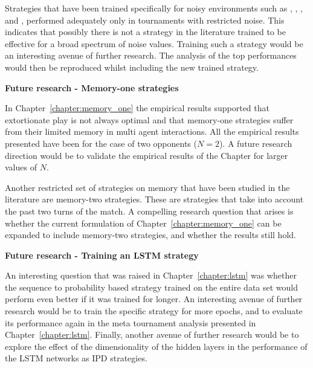 Strategies that have been trained specifically for noisy environments such
as \DBS, \EvolvedFSMSixTeenNoiseZeroFive, \EvolvedANNFiveNoiseZeroFive, \PSOGamblerTwoTwoTwoNoiseZeroFive
and \OmegaTFT, performed adequately only in tournaments with restricted
noise. This indicates that possibly there is not a strategy in the literature
trained to be effective for a broad spectrum of noise values. Training such
a strategy would be an interesting avenue of further research. The analysis of the
top performances would then be reproduced whilst including the new trained strategy.

\textbf{Future research - Memory-one strategies}

In Chapter~\ref{chapter:memory_one} the empirical results supported that
extortionate play is not always optimal and that memory-one strategies suffer
from their limited memory in multi agent interactions. All the empirical results
presented have been for the case of two opponents (\(N=2\)). A
future research direction would be to validate the empirical results of the Chapter for
larger values of \(N\).

Another restricted set of strategies on memory that have been studied in the literature
are memory-two strategies. These are strategies that take into account the past
two turns of the match. A compelling research question that arises is whether
the current formulation of Chapter~\ref{chapter:memory_one} can be expanded to
include memory-two strategies, and whether the results still hold.

\textbf{Future research - Training an LSTM strategy}

An interesting question that was raised in Chapter~\ref{chapter:lstm} was
whether the sequence to probability based strategy trained on the entire data
set would perform even better if it was trained for longer. An interesting
avenue of further research would be to train the specific strategy for more
epochs, and to evaluate its performance again in the meta tournament analysis
presented in Chapter~\ref{chapter:lstm}. Finally, another avenue of further
research would be to explore the effect of the dimensionality of the hidden
layers in the performance of the LSTM networks as IPD strategies.
